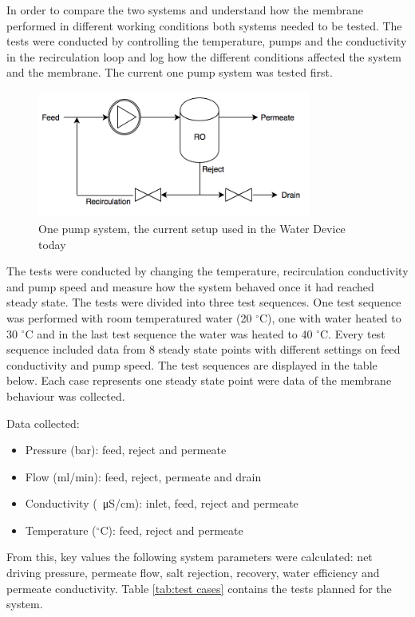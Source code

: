 In order to compare the two systems and understand how the membrane performed in different working conditions both systems needed to be tested. The tests were conducted by controlling the temperature, pumps and the conductivity in the recirculation loop and log how the different conditions affected the system and the membrane. The current one pump system was tested first.
\begin{figure}[H]
  \centering
    \includegraphics[width=0.8\textwidth]{Sys1}
    \caption{One pump system, the current setup used in the Water Device today}
    \label{fig:System1}
\end{figure}

The tests were conducted by changing the temperature, recirculation conductivity and pump speed and measure how the system behaved once it had reached steady state. The tests were divided into three test sequences. One test sequence was performed with room temperatured water (20  $^{\circ}$C), one with water heated to 30  $^{\circ}$C and in the last test sequence the water was heated to 40  $^{\circ}$C. Every test sequence included data from 8 steady state points with different settings on feed conductivity and pump speed. The test sequences are displayed in the table below. Each case represents one steady state point were data of the membrane behaviour was collected. 

Data collected:

\begin{itemize}
\item Pressure (bar): feed, reject and permeate
\item Flow (ml/min): feed, reject, permeate and drain
\item Conductivity (\SI{}{\micro\siemens}/cm): inlet, feed, reject and permeate
\item Temperature ($^\circ$C): feed, reject and permeate
\end{itemize}

From this, key values the following system parameters were calculated: net driving pressure, permeate flow, salt rejection, recovery, water efficiency and permeate conductivity. Table  \ref{tab:test cases} contains the tests planned for the system.

